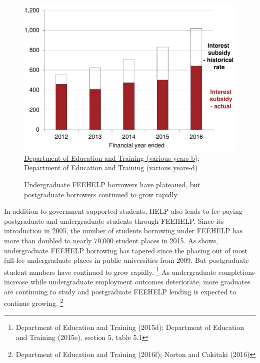 \documentclass[embargoed]{grattan}
\begin{document}
\begin{figure}
\caption[Undergraduate FEE-HELP borrowers have plateaued, but postgraduate borrowers continued to grow rapidly]{Undergraduate \gls{FEEHELP} borrowers have plateaued, but postgraduate borrowers continued to grow rapidly}\label{fig:fig5-undergrad-HELP-borrowers-have-plateaued-but-postgrad-borrowers-continued-to-grow-rapidly}

\includegraphics[page=5]{atlas/Chartpack.pdf}
%
{\protect\hyperlink{_ENREF_36}{Department of Education and Training (various years-b}); \protect\hyperlink{_ENREF_38}{Department of Education and Training (various years-d})}
\end{figure}

In addition to government-supported students, \gls{HELP} also lends to fee-paying postgraduate and undergraduate students through \gls{FEEHELP}.
Since its introduction in 2005, the number of students borrowing under \gls{FEEHELP} has more than doubled to nearly 70,000 student places in 2015.
As  shows, undergraduate \gls{FEEHELP} borrowing has tapered since the phasing out of most full-fee undergraduate places in public universities from 2009.
But postgraduate student numbers have continued to grow rapidly.%
\footnote{Department of Education and Training (2015d); Department of Education and Training (2015e), section 5, table 5.1} As undergraduate completions increase while undergraduate employment outcomes deteriorate, more graduates are continuing to study and postgraduate \gls{FEEHELP} lending is expected to continue growing.%
\footnote{Department of Education and Training (2016f); Norton and Cakitaki (2016)}
\end{document}
